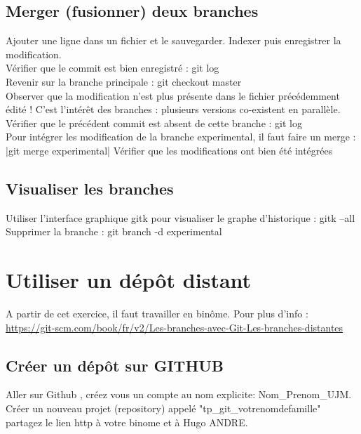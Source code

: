 \subsection{Merger (fusionner) deux branches}
Ajouter une ligne dans un fichier et le sauvegarder. Indexer puis enregistrer la modification.\\
Vérifier que le commit est bien enregistré : git log\\
Revenir sur la branche principale : git checkout master\\
Observer que la modification n'est plus présente dans le fichier précédemment édité ! C'est
l'intérêt des branches : plusieurs versions co-existent en parallèle.\\
Vérifier que le précédent commit est absent de cette branche : git log\\
Pour intégrer les modification de la branche experimental, il faut faire un merge : |git merge experimental|
Vérifier que les modifications ont bien été intégrées
\subsection{Visualiser les branches}
Utiliser l'interface graphique gitk pour visualiser le graphe d'historique : gitk --all\\
Supprimer la branche : git branch -d experimental
\section{Utiliser un dépôt distant}
A partir de cet exercice, il faut travailler en binôme. Pour plus d'info :
\url{https://git-scm.com/book/fr/v2/Les-branches-avec-Git-Les-branches-distantes}
\subsection{Créer un dépôt sur GITHUB}
Aller sur Github , créez vous un compte au nom explicite: Nom\_Prenom\_UJM.\\
Créer un nouveau projet (repository) appelé "tp\_git\_votrenomdefamille"\\
partagez le lien http à votre binome et à Hugo ANDRE.
